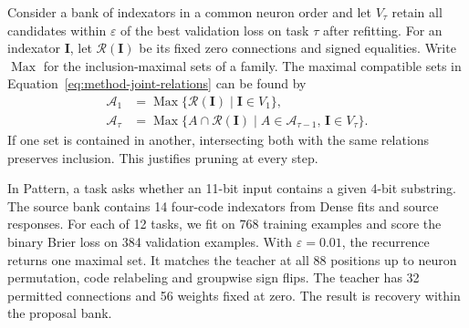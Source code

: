 Consider a bank of indexators in a common neuron order and let
$V_\tau$ retain all candidates within $\varepsilon$ of the best
validation loss on task $\tau$ after refitting. For an indexator
$\mathbf I$, let $\mathcal R(\mathbf I)$ be its fixed zero
connections and signed equalities. Write $\operatorname{Max}$
for the inclusion-maximal sets of a family. The maximal
compatible sets in Equation~\eqref{eq:method-joint-relations}
can be found by
\[
    \begin{aligned}
        \mathcal A_1&=\operatorname{Max}
            \{\mathcal R(\mathbf I)\mid\mathbf I\in V_1\},\\
        \mathcal A_\tau&=\operatorname{Max}
            \{A\cap\mathcal R(\mathbf I)\mid
               A\in\mathcal A_{\tau-1},\,\mathbf I\in V_\tau\}.
    \end{aligned}
\]
If one set is contained in another, intersecting both with the
same relations preserves inclusion. This justifies pruning at
every step.

In Pattern, a task asks whether an 11-bit input contains a given
4-bit substring. The source bank contains 14 four-code indexators
from Dense fits and source responses. For each of 12 tasks, we fit
on 768 training examples and score the binary Brier loss on 384 validation
examples. With $\varepsilon=0.01$, the recurrence returns one
maximal set. It matches the teacher at all 88 positions up to
neuron permutation, code relabeling and groupwise sign flips.
The teacher has 32 permitted connections and 56 weights fixed at zero.
The result is recovery within the proposal bank.
